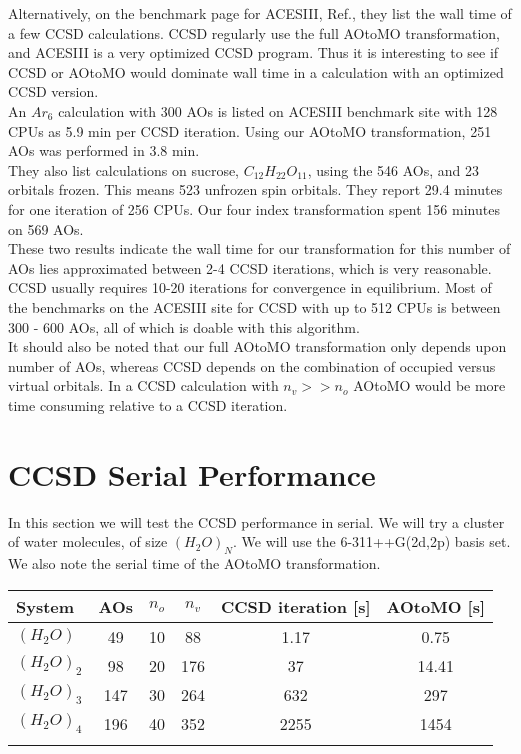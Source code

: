 Alternatively, on the benchmark page for ACESIII, Ref.\cite{aces_non_ref}, they list the wall time of a few CCSD calculations. CCSD regularly use the full AOtoMO transformation, and ACESIII is a very optimized CCSD program. Thus it is interesting to see if CCSD or AOtoMO would dominate wall time in a calculation with an optimized CCSD version. \\

An $Ar_6$ calculation with 300 AOs is listed on ACESIII benchmark site with 128 CPUs as 5.9 min per CCSD iteration. Using our AOtoMO transformation, 251 AOs was performed in 3.8 min. \\

They also list calculations on sucrose, $C_{12} H_{22} O_{11}$, using the 546 AOs, and 23 orbitals frozen. This means 523 unfrozen spin orbitals. They report 29.4 minutes for one iteration of 256 CPUs. Our four index transformation spent 156 minutes on 569 AOs. \\

These two results indicate the wall time for our transformation for this number of AOs lies approximated between 2-4 CCSD iterations, which is very reasonable. CCSD usually requires 10-20 iterations for convergence in equilibrium. Most of the benchmarks on the ACESIII site for CCSD with up to 512 CPUs is between 300 - 600 AOs, all of which is doable with this algorithm. \\

It should also be noted that our full AOtoMO transformation only depends upon number of AOs, whereas CCSD depends on the combination of occupied versus virtual orbitals. In a CCSD calculation with $n_v >> n_o$ AOtoMO would be more time consuming relative to a CCSD iteration. 

\section{CCSD Serial Performance \label{ccsdserialperformance_ppp}}
In this section we will test the CCSD performance in serial. We will try a cluster of water molecules, of size $(H_2O)_N$. We will use the 6-311++G(2d,2p) basis set. We also note the serial time of the AOtoMO transformation. 

\begin{center}
\begin{tabular}{ l c c c c c }
	\hline
  	System & AOs & $n_o$ & $n_v$ & CCSD iteration [s] & AOtoMO [s] \\ \hline
  	$(H_2O)$ & 49 & 10 & 88      & 1.17 & 0.75  \\ 
  	$(H_2O)_2$ & 98 & 20 & 176   & 37 & 14.41 \\ 
  	$(H_2O)_3$ & 147 & 30 & 264  & 632 & 297  \\
  	$(H_2O)_4$ & 196 & 40 & 352  & 2255 & 1454 \\ 
  	\hline
  	\\
	\end{tabular}
\end{center}


